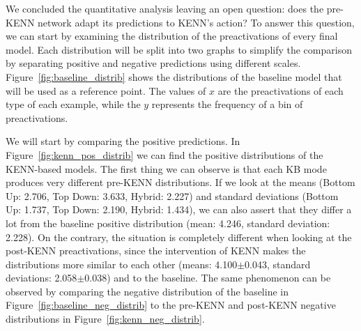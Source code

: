 We concluded the quantitative analysis leaving an open question: does the pre-KENN network adapt its predictions to KENN's action? To answer this question, we can start by examining the distribution of the preactivations of every final model. Each distribution will be split into two graphs to simplify the comparison by separating positive and negative predictions using different scales. Figure~\ref{fig:baseline_distrib} shows the distributions of the baseline model that will be used as a reference point. The values of $x$ are the preactivations of each type of each example, while the $y$ represents the frequency of a bin of preactivations.

We will start by comparing the positive predictions. In Figure~\ref{fig:kenn_pos_distrib} we can find the positive distributions of the KENN-based models. The first thing we can observe is that each KB mode produces very different pre-KENN distributions. If we look at the means (Bottom Up: 2.706, Top Down: 3.633, Hybrid: 2.227) and standard deviations (Bottom Up: 1.737, Top Down: 2.190, Hybrid: 1.434), we can also assert that they differ a lot from the baseline positive distribution (mean: 4.246, standard deviation: 2.228). On the contrary, the situation is completely different when looking at the post-KENN preactivations, since the intervention of KENN makes the distributions more similar to each other (means: 4.100$\pm$0.043, standard deviations: 2.058$\pm$0.038) and to the baseline. The same phenomenon can be observed by comparing the negative distribution of the baseline in Figure~\ref{fig:baseline_neg_distrib} to the pre-KENN and post-KENN negative distributions in Figure~\ref{fig:kenn_neg_distrib}.

